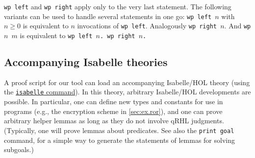 \documentclass{article}
\begin{document}
\medskip

\texttt{wp left} and \texttt{wp right} apply only to the very last statement.
The following variants can be used to handle several statements in one go:
\texttt{wp left $n$} with $n\geq0$ is equivalent to $n$
invocations of \texttt{wp left}.
Analogously \texttt{wp right $n$}.
And \texttt{wp $n$ $m$} is equivalent to \texttt{wp left $n$. wp right $n$.}

\subsection{Accompanying Isabelle theories}
\label{sec:isabelle}

A proof script for our tool can load an accompanying Isabelle/HOL
theory (using the \hyperref[command:isabelle]{\texttt{isabelle} command}). In this theory,
arbitrary Isabelle/HOL developments are possible.  In particular, one
can define new types and constants for use in programs (e.g., the
encryption scheme in \autoref{sec:ex.ror}), and one can prove
arbitrary helper lemmas as long as they do not involve qRHL
judgments.
(Typically, one will prove lemmas about predicates. See also the \texttt{print goal} command,  for a simple way to generate the statements of lemmas for solving subgoals.)
\end{document}

